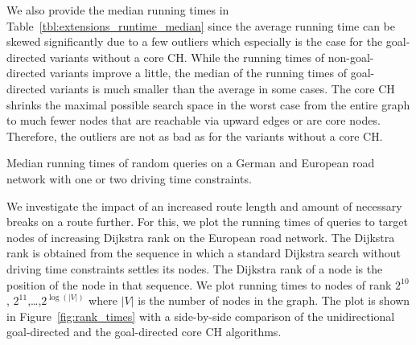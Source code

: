 We also provide the median running times in Table~\ref{tbl:extensions_runtime_median} since the average running time can be skewed significantly due to a few outliers which especially is the case for the goal-directed variants without a core CH. While the running times of non-goal-directed variants improve a little, the median of the running times of goal-directed variants is much smaller than the average in some cases. The core CH shrinks the maximal possible search space in the worst case from the entire graph to much fewer nodes that are reachable via upward edges or are core nodes. Therefore, the outliers are not as bad as for the variants without a core CH.

\begin{table}[hbtp]
	\centering
	
	\caption{Median running times of random queries on a German and European road network with one or two driving time constraints.}
	\label{tbl:extensions_runtime_median}
\end{table}

We investigate the impact of an increased route length and amount of necessary breaks on a route further. For this, we plot the running times of queries to target nodes of increasing Dijkstra rank on the European road network. The Dijkstra rank is obtained from the sequence in which a standard Dijkstra search without driving time constraints settles its nodes. The Dijkstra rank of a node is the position of the node in that sequence. We plot running times to nodes of rank $2^{10}$, $2^{11}$,\dots,$2^{\log(|V|)}$ where $|V|$ is the number of nodes in the graph. The plot is shown in Figure~\ref{fig:rank_times} with a side-by-side comparison of the unidirectional goal-directed and the goal-directed core CH algorithms.

